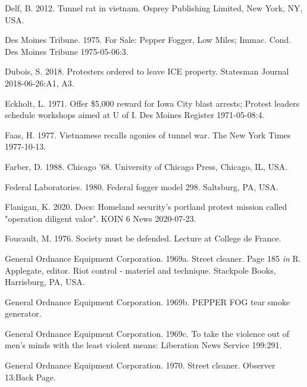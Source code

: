 \documentclass[
  11pt,
]{krantz}
\newlength{\cslhangindent}
\newlength{\cslentryspacingunit} %
\newenvironment{CSLReferences}[2] %
 {%
  \setlength{\parindent}{0pt}
  \ifodd #1
  \let\oldpar\par
  \def\par{\hangindent=\cslhangindent\oldpar}
  \fi
  \setlength{\parskip}{#2\cslentryspacingunit}
 }%
 {}
\begin{document}
\begin{CSLReferences}{1}{0}
\leavevmode{}%
Delf, B. 2012. Tunnel rat in vietnam. Osprey Publishing Limited, New York, NY, USA.

\leavevmode{}%
Des Moines Tribune. 1975. {For Sale: Pepper Fogger, Low Miles; Immac. Cond.} Des Moines Tribune 1975-05-06:3.

\leavevmode{}%
Dubois, S. 2018. Protesters ordered to leave ICE property. Statesman Journal 2018-06-26:A1, A3.

\leavevmode{}%
Eckholt, L. 1971. {Offer \$5,000 reward for Iowa City blast arrests; Protest leaders schedule workshops aimed at U of I}. Des Moines Register 1971-05-08:4.

\leavevmode{}%
Faas, H. 1977. Vietnamese recalls agonies of tunnel war. The New York Times 1977-10-13.

\leavevmode{}%
Farber, D. 1988. Chicago '68. University of Chicago Press, Chicago, IL, USA.

\leavevmode{}%
Federal Laboratories. 1980. Federal fogger model 298. Saltsburg, PA, USA.

\leavevmode{}%
Flanigan, K. 2020. Docs: Homeland security's portland protest mission called "operation diligent valor". KOIN 6 News 2020-07-23.

\leavevmode{}%
Foucault, M. 1976. Society must be defended. Lecture at College de France.

\leavevmode{}%
General Ordnance Equipment Corporation. 1969a. Street cleaner. Page 185 \emph{in} R. Applegate, editor. Riot control - materiel and technique. Stackpole Books, Harrisburg, PA, USA.

\leavevmode{}%
General Ordnance Equipment Corporation. 1969b. PEPPER FOG tear smoke generator.

\leavevmode{}%
General Ordnance Equipment Corporation. 1969c. To take the violence out of men's minds with the least violent means: Liberation News Service 199:291.

\leavevmode{}%
General Ordnance Equipment Corporation. 1970. Street cleaner. Observer 13:Back Page.


\end{CSLReferences}
\end{document}
